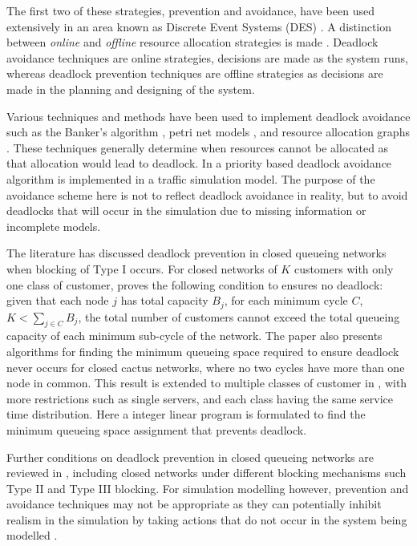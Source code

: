 \documentclass{article}
\numberwithin{equation}{section}
\begin{document}
The first two of these strategies, prevention and avoidance, have been used
extensively in an area known as Discrete Event Systems (DES)
\cite{reveliotis15a, reveliotis15b}.
A distinction between \textit{online} and \textit{offline} resource allocation
strategies is made \cite{venkateshsmith05}.
Deadlock avoidance techniques are online strategies, decisions are made as the
system runs, whereas deadlock prevention techniques are offline strategies as
decisions are made in the planning and designing of the system.

Various techniques and methods have been used to implement deadlock avoidance
such as the Banker's algorithm \cite{dijkstra82, kawadkaretal14}, petri net
models \cite{viswanadhametal90, ezpeletaetal02, marchettimunierkordon09}, and
resource allocation graphs \cite{belik90}.
These techniques generally determine when resources cannot be allocated as
that allocation would lead to deadlock.
In \cite{florianetal08} a priority based deadlock avoidance algorithm is
implemented in a traffic simulation model.
The purpose of the avoidance scheme here is not to reflect deadlock avoidance
in reality, but to avoid deadlocks that will occur in the simulation due to
missing information or incomplete models.

The literature has discussed deadlock prevention in closed queueing networks
when blocking of Type I occurs.
For closed networks of $K$ customers with only one class of customer,
\cite{kunduakyildiz89} proves the following condition to ensures no deadlock:
given that each node $j$ has total capacity $B_j$, for each minimum cycle $C$,
$K < \sum_{j\in C} B_j$, the total number of customers cannot exceed the total
queueing capacity of each minimum sub-cycle of the network.
The paper also presents algorithms for finding the minimum queueing space
required to ensure deadlock never occurs for closed cactus networks, where no
two cycles have more than one node in common.
This result is extended to multiple classes of customer in
\cite{liebeherrakyildiz95}, with more restrictions such as single servers, and
each class having the same service time distribution.
Here a integer linear program is formulated to find the minimum queueing space
assignment that prevents deadlock.

Further conditions on deadlock prevention in closed queueing networks are
reviewed in \cite{onvural90}, including closed networks under different
blocking mechanisms such Type II and Type III blocking.
For simulation modelling however, prevention and avoidance techniques may not
be appropriate as they can potentially inhibit realism in the simulation by
taking actions that do not occur in the system being modelled
\cite{venkateshetal98}.
\end{document}
